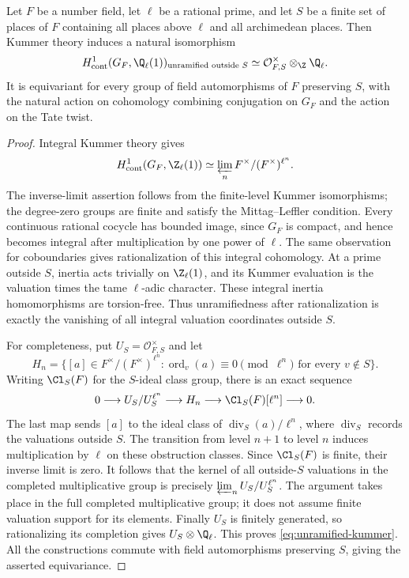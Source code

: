 \begin{lemma}\label{lem:kummer-unramified}
Let $F$ be a number field, let $\ell$ be a rational prime, and let $S$ be a finite set of places of $F$ containing all places above $\ell$ and all archimedean places. Then Kummer theory induces a natural isomorphism
\begin{equation}\label{eq:unramified-kummer}
 H^1_{\mathrm{cont}}(G_F,\Q_\ell(1))
 _{\text{unramified outside }S}
 \simeq \mathcal O_{F,S}^{\times}\otimes_{\Z}\Q_\ell.
\end{equation}
It is equivariant for every group of field automorphisms of $F$ preserving $S$, with the natural action on cohomology combining conjugation on $G_F$ and the action on the Tate twist.
\end{lemma}
\begin{proof}
Integral Kummer theory gives
\[
 H^1_{\mathrm{cont}}(G_F,\Z_\ell(1))
 \simeq\varprojlim_n F^\times/(F^\times)^{\ell^n}.
\]
The inverse-limit assertion follows from the finite-level Kummer isomorphisms; the degree-zero groups are finite and satisfy the Mittag--Leffler condition. Every continuous rational cocycle has bounded image, since $G_F$ is compact, and hence becomes integral after multiplication by one power of $\ell$. The same observation for coboundaries gives rationalization of this integral cohomology. At a prime outside $S$, inertia acts trivially on $\Z_\ell(1)$, and its Kummer evaluation is the valuation times the tame $\ell$-adic character. These integral inertia homomorphisms are torsion-free. Thus unramifiedness after rationalization is exactly the vanishing of all integral valuation coordinates outside $S$.

For completeness, put $U_S=\mathcal O_{F,S}^\times$ and let
\[
 H_n=\{[a]\in F^\times/(F^\times)^{\ell^n}:
       \operatorname{ord}_v(a)\equiv0\pmod{\ell^n}
       \text{ for every }v\notin S\}.
\]
Writing $\Cl_S(F)$ for the $S$-ideal class group, there is an exact sequence
\begin{equation}\label{eq:s-unit-completion}
 0\longrightarrow U_S/U_S^{\ell^n}
 \longrightarrow H_n
 \longrightarrow \Cl_S(F)[\ell^n]
 \longrightarrow0.
\end{equation}
The last map sends $[a]$ to the ideal class of
$\operatorname{div}_S(a)/\ell^n$, where $\operatorname{div}_S$ records the valuations outside $S$. The transition from level $n+1$ to level $n$ induces multiplication by $\ell$ on these obstruction classes. Since $\Cl_S(F)$ is finite, their inverse limit is zero. It follows that the kernel of all outside-$S$ valuations in the completed multiplicative group is precisely $\varprojlim_n U_S/U_S^{\ell^n}$. The argument takes place in the full completed multiplicative group; it does not assume finite valuation support for its elements. Finally $U_S$ is finitely generated, so rationalizing its completion gives $U_S\otimes\Q_\ell$. This proves \eqref{eq:unramified-kummer}. All the constructions commute with field automorphisms preserving $S$, giving the asserted equivariance.
\end{proof}

